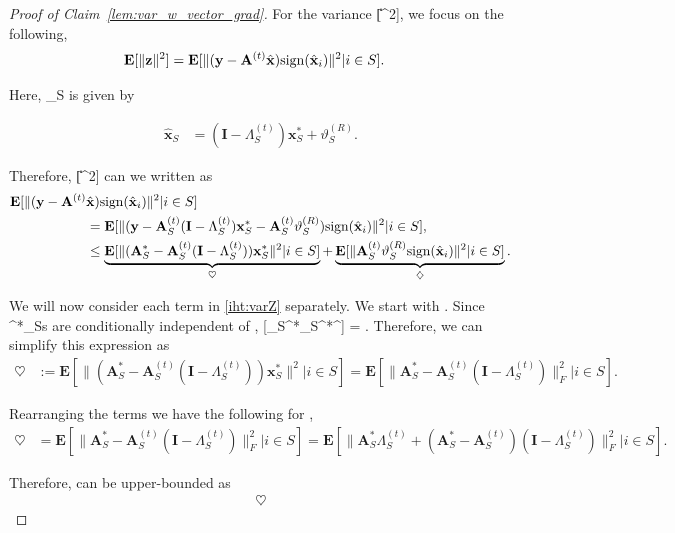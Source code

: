 \documentclass{article}
\newcommand{\sgn}{{\rm sign}}
\def\[#1\]{{$#1$}}
\def\b#1{{\mathbf{#1}}}
\begin{document}
\begin{proof}[Proof of Claim~\ref{lem:var_w_vector_grad}]
	For the variance \[\b{E}[\|\b{z}\|^2]\], we focus on the following,
	\begin{align*}
	\b{E}[\|\b{z}\|^2] &= \b{E}[ \|( \b{y}- \b{A}^{(t)}\hat{\b{x}})\sgn(\hat{\b{x}}_i)\|^2|i\in S].
	\end{align*}
	
	Here, \[\hat{\b{x}}_S\] is given by


		\begin{align*}
		\hat{\b{x}}_S &= (\b{I} - \Lambda^{(t)}_S) \b{x}^*_S  + \vartheta^{(R)}_S.
		\end{align*}
		
		Therefore, \[\b{E}[\|\b{z}\|^2]\] can we written as
	\begin{align}
	\label{iht:varZ}
	\b{E}[\|( \b{y}- \b{A}^{(t)}&\hat{\b{x}})\sgn(\hat{\b{x}}_i)\|^2|i\in S] \notag\\
	&= \b{E}[\|( \b{y}- \b{A}^{(t)}_S(\b{I} - \Lambda^{(t)}_S)\b{x}^*_S  - \b{A}^{(t)}_S\vartheta^{(R)}_S)\sgn(\hat{\b{x}}_i)\|^2|i\in S],\notag\\


	&\leq  \underbrace{\b{E}[\|( \b{A}^*_S- \b{A}^{(t)}_S(\b{I} - \Lambda^{(t)}_S))\b{x}^*_S \|^2|i\in S]}_{\heartsuit}+ \underbrace{\b{E}[\|\b{A}^{(t)}_S\vartheta^{(R)}_S\sgn(\hat{\b{x}}_i)\|^2|i\in S]}_{\diamondsuit}.
	\end{align}
	
	We will now consider each term in \eqref{iht:varZ} separately. We start with \[\heartsuit\]. Since \[\b{x}^*_S\]s are conditionally independent of \[S\], \[\b{E}[\b{x}_S^*\b{x}_S^{*^\top}] = \b{I}\]. Therefore, we can simplify this expression as
	\begin{align*}
	\heartsuit &:= \b{E}[\|( \b{A}^*_S- \b{A}^{(t)}_S(\b{I} - \Lambda^{(t)}_S))\b{x}^*_S \|^2|i\in S] 
	= \b{E}[\| \b{A}^*_S- \b{A}^{(t)}_S(\b{I} - \Lambda^{(t)}_S)\|^2_F|i\in S].
	\end{align*}
	
	Rearranging the terms we have the following for \[\heartsuit\],
	\begin{align*}
	\heartsuit & 
	= \b{E}[\| \b{A}^*_S- \b{A}^{(t)}_S(\b{I} - \Lambda^{(t)}_S)\|^2_F|i\in S]

	= \b{E}[\| \b{A}^*_S\Lambda^{(t)}_S + (\b{A}^*_S - \b{A}^{(t)}_S)(\b{I} - \Lambda^{(t)}_S)\|^2_F|i\in S].

	\end{align*}
	
	Therefore, \[\heartsuit\] can be upper-bounded as
	\begin{align}
	\label{iht:varZ_term1}
	\heartsuit 
	

\end{align}
\end{proof}
\end{document}
